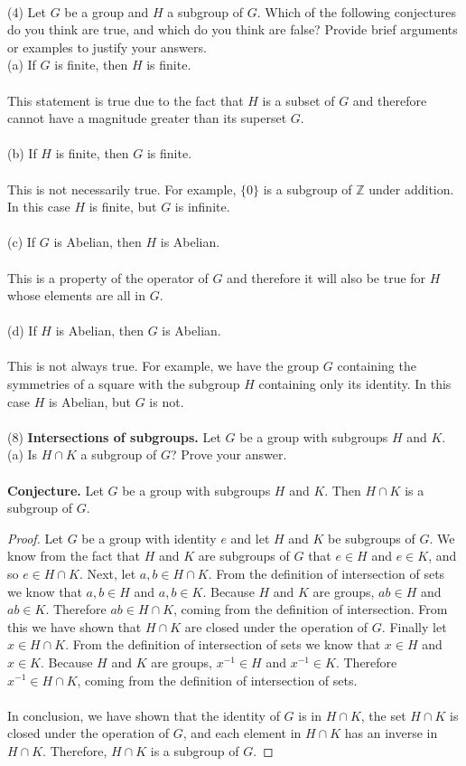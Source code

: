 \documentclass[11pt,a4paper]{article}
\begin{document}
~\\
(4) Let $G$ be a group and $H$ a subgroup of $G$. Which of the following conjectures do you think are true, and which do you think are false? Provide brief arguments or examples to justify your answers.\\
(a) If $G$ is finite, then $H$ is finite.\\
~\\
This statement is true due to the fact that $H$ is a subset of $G$ and therefore cannot have a magnitude greater than its superset $G$.\\
~\\
(b) If $H$ is finite, then $G$ is finite.\\
~\\
This is not necessarily true. For example, $\{0\}$ is a subgroup of $\mathbb{Z}$ under addition. In this case $H$ is finite, but $G$ is infinite.\\
~\\
(c) If $G$ is Abelian, then $H$ is Abelian.\\
~\\
This is a property of the operator of $G$ and therefore it will also be true for $H$ whose elements are all in $G$.\\
~\\
(d) If $H$ is Abelian, then $G$ is Abelian.\\
~\\
This is not always true. For example, we have the group $G$ containing the symmetries of a square with the subgroup $H$ containing only its identity. In this case $H$ is Abelian, but $G$ is not.\\
~\\
(8) {\bf Intersections of subgroups.} Let $G$ be a group with subgroups $H$ and $K$.\\
(a) Is $H \cap K$ a subgroup of $G$? Prove your answer.\\
~\\
{\bf Conjecture.} Let $G$ be a group with subgroups $H$ and $K$. Then $H \cap K$ is a subgroup of $G$.
\begin{proof}
Let $G$ be a group with identity $e$ and let $H$ and $K$ be subgroups of $G$. We know from the fact that $H$ and $K$ are subgroups of $G$ that $e\in H$ and $e\in K$, and so $e\in H\cap K$. Next, let $a,b\in H\cap K$. From the definition of intersection of sets we know that $a,b\in H$ and $a,b\in K$. Because $H$ and $K$ are groups, $ab\in H$ and $ab\in K$. Therefore $ab\in H\cap K$, coming from the definition of intersection. From this we have shown that $H\cap K$ are closed under the operation of $G$. Finally let $x\in H\cap K$. From the definition of intersection of sets we know that $x\in H$ and $x\in K$. Because $H$ and $K$ are groups, $x^{-1}\in H$ and $x^{-1}\in K$. Therefore $x^{-1}\in H\cap K$, coming from the definition of intersection of sets.\\
~\\
In conclusion, we have shown that the identity of $G$ is in $H\cap K$, the set $H\cap K$ is closed under the operation of $G$, and each element in $H\cap K$ has an inverse in $H\cap K$. Therefore, $H\cap K$ is a subgroup of $G$.
\end{proof}
\end{document}
